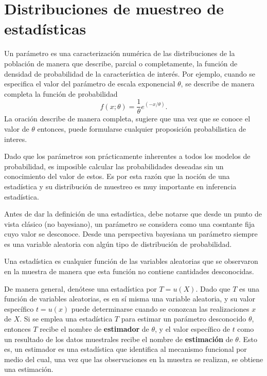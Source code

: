 \setcounter{section}{2}
\section{Distribuciones de muestreo de estadísticas}


\begin{def.}
    Un parámetro es una caracterización numérica de las distribuciones de la población de manera que describe, parcial o completamente, la función de densidad de probabilidad de la característica de interés. Por ejemplo, cuando se especifica el valor del parámetro de escala exponencial $\theta$, se describe de manera completa la función de probabilidad
    $$f(x;\theta)=\dfrac{1}{\theta}e^{(-x/\theta)}.$$
    La oración describe de manera completa, sugiere que una vez que se conoce el valor de $\theta$ entonces, puede formularse cualquier proposición probabilistica de interes.
\end{def.}

Dado que los parámetros son prácticamente inherentes a todos los modelos de probabilidad, es imposible calcular las probabilidades deseadas sin un conocimiento del valor de estos. Es por esta razón que la noción de una estadística y su distribución de muestreo es muy importante en inferencia estadística.

Antes de dar la definición de una estadística, debe notarse que desde un punto de vista clásico (no bayesiano), un parámetro se considera como una cosntante fija cuyo valor se desconoce. Desde una perspectiva bayesiana un parámetro siempre es una variable aleatoria con algún tipo de distribución de probabilidad.

\begin{def.}
    Una estadística es cualquier función de las variables aleatorias que se observaron en la muestra de manera que esta función no contiene cantidades desconocidas.
\end{def.}

De manera general, denótese una estadística por $T=u(X)$. Dado que $T$ es una función de variables aleatorias, es en sí misma una variable aleatoria, y su valor específico $t=u(x)$ puede determinarse cuando se conozcan las realizaciones $x$ de $X$. Si se emplea una estadística $T$ para estimar un parámetro desconocido $\theta$, entonces $T$ recibe el nombre de \textbf{estimador} de $\theta$, y el valor específico de $t$ como un resultado de los datos muestrales recibe el nombre de \textbf{estimación} de $\theta$. Esto es, un estimador es una estadística que identifica al mecanismo funcional por medio del cual, una vez que las observaciones en la muestra se realizan, se obtiene una estimación.\\

